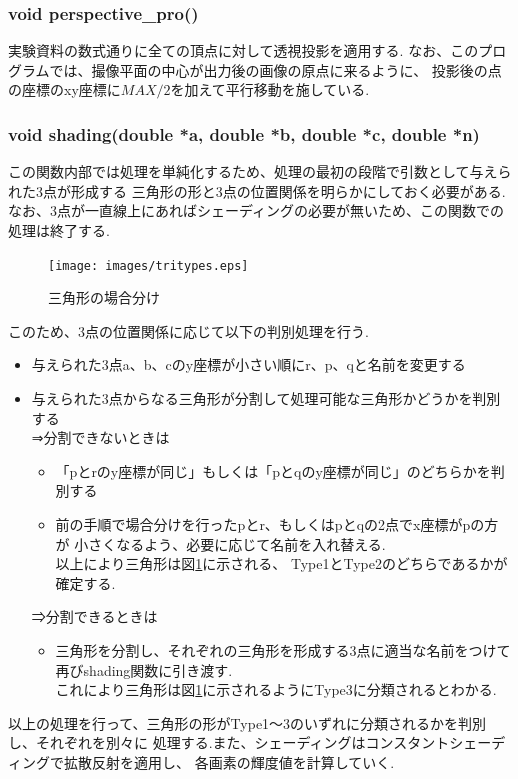 \documentclass[a4j,dvipdfmx]{jsarticle}
\begin{document}
\subsubsection{void perspective\_pro()}
実験資料の数式通りに全ての頂点に対して透視投影を適用する.
なお、このプログラムでは、撮像平面の中心が出力後の画像の原点に来るように、
投影後の点の座標のxy座標に$MAX/2$を加えて平行移動を施している.

\subsubsection{void shading(double *a, double *b, double *c, double *n)}
この関数内部では処理を単純化するため、処理の最初の段階で引数として与えられた3点が形成する
三角形の形と3点の位置関係を明らかにしておく必要がある.
なお、3点が一直線上にあればシェーディングの必要が無いため、この関数での処理は終了する.
\begin{figure}[b]
  \begin{center}
        \texttt{[image: images/tritypes.eps]}
        \caption{三角形の場合分け}
        \label{fig:tritypes}
  \end{center}
\end{figure}
このため、3点の位置関係に応じて以下の判別処理を行う.
\begin{itemize}
\item 与えられた3点a、b、cのy座標が小さい順にr、p、qと名前を変更する
\item 与えられた3点からなる三角形が分割して処理可能な三角形かどうかを判別する\\
  
  ⇒分割できないときは
  \begin{itemize}
  \item 「pとrのy座標が同じ」もしくは「pとqのy座標が同じ」のどちらかを判別する\\
  \item 前の手順で場合分けを行ったpとr、もしくはpとqの2点でx座標がpの方が
    小さくなるよう、必要に応じて名前を入れ替える.\\
    以上により三角形は図\ref{fig:tritypes}に示される、
    Type1とType2のどちらであるかが確定する.
  \end{itemize}
  
  ⇒分割できるときは
  \begin{itemize}
  \item 三角形を分割し、それぞれの三角形を形成する3点に適当な名前をつけて
    再びshading関数に引き渡す.\\
    これにより三角形は図\ref{fig:tritypes}に示されるようにType3に分類されるとわかる.
  \end{itemize}
\end{itemize}
以上の処理を行って、三角形の形がType1〜3のいずれに分類されるかを判別し、それぞれを別々に
処理する.また、シェーディングはコンスタントシェーディングで拡散反射を適用し、
各画素の輝度値を計算していく.
\end{document}
